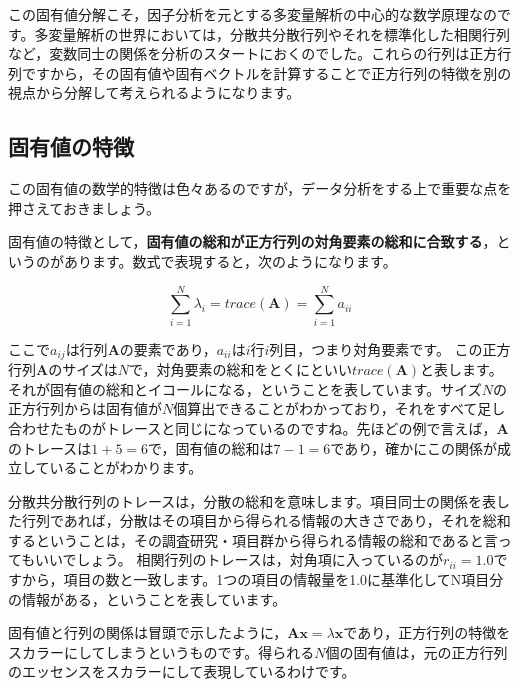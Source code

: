 \documentclass{ltjsbook}
\begin{document}
この固有値分解こそ，因子分析を元とする多変量解析の中心的な数学原理なのです。多変量解析の世界においては，分散共分散行列やそれを標準化した相関行列など，変数同士の関係を分析のスタートにおくのでした。これらの行列は正方行列ですから，その固有値や固有ベクトルを計算することで正方行列の特徴を別の視点から分解して考えられるようになります。

\subsection{固有値の特徴}
この固有値の数学的特徴は色々あるのですが，データ分析をする上で重要な点を押さえておきましょう。

固有値の特徴として，\textbf{固有値の総和が正方行列の対角要素の総和に合致する}，というのがあります。数式で表現すると，次のようになります。

\[ \sum_{i=1}^N \lambda_i = trace(\bm{A}) = \sum_{i=1}^N a_{ii} \]

ここで$a_{ij}$は行列$\bm{A}$の要素であり，$a_{ii}$は$i$行$i$列目，つまり対角要素です。
この正方行列$\bm{A}$のサイズは$N$で，対角要素の総和をとくにといい$trace(\bm{A})$と表します。
それが固有値の総和とイコールになる，ということを表しています。サイズ$N$の正方行列からは固有値が$N$個算出できることがわかっており，それをすべて足し合わせたものがトレースと同じになっているのですね。先ほどの例で言えば，$\bm{A}$のトレースは$1+5=6$で，固有値の総和は$7-1=6$であり，確かにこの関係が成立していることがわかります。

分散共分散行列のトレースは，分散の総和を意味します。項目同士の関係を表した行列であれば，分散はその項目から得られる情報の大きさであり，それを総和するということは，その調査研究・項目群から得られる情報の総和であると言ってもいいでしょう。
相関行列のトレースは，対角項に入っているのが$r_{ii}=1.0$ですから，項目の数と一致します。1つの項目の情報量を1.0に基準化してN項目分の情報がある，ということを表しています。

固有値と行列の関係は冒頭で示したように，$\bm{Ax}=\lambda \bm{x}$であり，正方行列の特徴をスカラーにしてしまうというものです。得られる$N$個の固有値は，元の正方行列のエッセンスをスカラーにして表現しているわけです。
\end{document}
